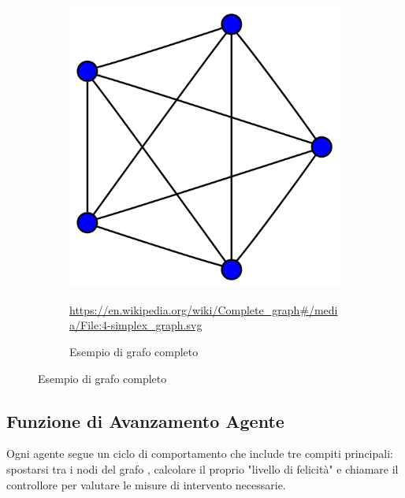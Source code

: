 \begin{figure}[!hb]
\begin{subfigure}[b]{0.45\textwidth}
		\includegraphics[width=\textwidth]{img/4-simplex_graph.svg.png}
		\caption{Esempio di grafo completo}
		\url{https://en.wikipedia.org/wiki/Complete_graph#/media/File:4-simplex_graph.svg}
		\label{fig:complete_graph_example}
	\end{subfigure}
\end{figure}

\subsection{Funzione di Avanzamento Agente}

Ogni agente segue un ciclo di comportamento che include tre compiti 
principali: spostarsi tra i nodi del grafo \cite{Ding2021}, calcolare 
il proprio "livello di felicità" e chiamare il controllore per 
valutare le misure di intervento necessarie.

